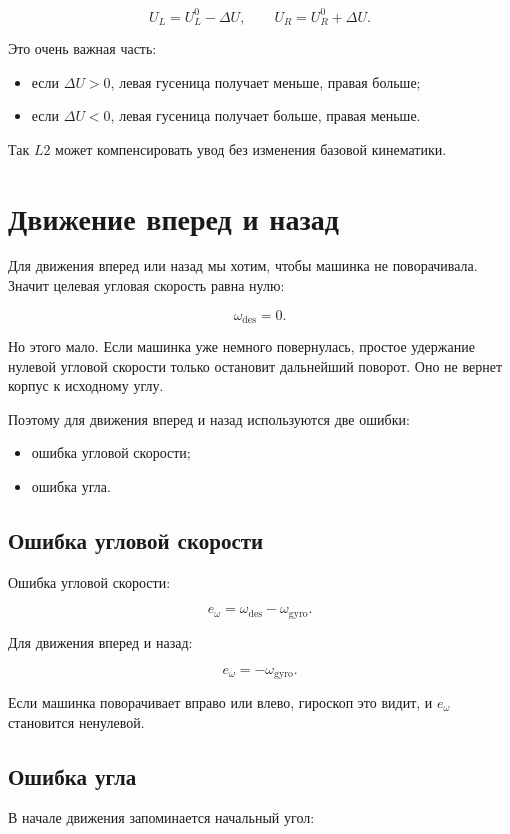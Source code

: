 \documentclass[12pt,a4paper]{article}
\newcommand{\wdes}{\omega_{\mathrm{des}}}
\newcommand{\wgyro}{\omega_{\mathrm{gyro}}}
\begin{document}
\[
U_L = U_L^0 - \Delta U,
\qquad
U_R = U_R^0 + \Delta U.
\]

Это очень важная часть:

\begin{itemize}
  \item если \(\Delta U > 0\), левая гусеница получает меньше, правая больше;
  \item если \(\Delta U < 0\), левая гусеница получает больше, правая меньше.
\end{itemize}

Так \(L2\) может компенсировать увод без изменения базовой кинематики.

\section{Движение вперед и назад}

Для движения вперед или назад мы хотим, чтобы машинка не поворачивала.
Значит целевая угловая скорость равна нулю:

\[
\wdes = 0.
\]

Но этого мало. Если машинка уже немного повернулась, простое удержание
нулевой угловой скорости только остановит дальнейший поворот. Оно не вернет
корпус к исходному углу.

Поэтому для движения вперед и назад используются две ошибки:

\begin{itemize}
  \item ошибка угловой скорости;
  \item ошибка угла.
\end{itemize}

\subsection{Ошибка угловой скорости}

Ошибка угловой скорости:

\[
e_\omega = \wdes - \wgyro.
\]

Для движения вперед и назад:

\[
e_\omega = -\wgyro.
\]

Если машинка поворачивает вправо или влево, гироскоп это видит, и
\(e_\omega\) становится ненулевой.

\subsection{Ошибка угла}

В начале движения запоминается начальный угол:
\end{document}
